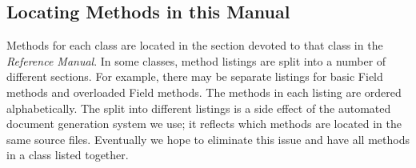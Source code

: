 \subsection{Locating Methods in this Manual}

Methods for each class are located in the section devoted to 
that class in the {\it Reference Manual}.  In some classes, method
listings
are split into a number of different sections.  For example, there may
be separate listings for basic Field methods and overloaded Field
methods.  The methods in each listing are ordered alphabetically.
The split into different
listings is a side effect of the automated document generation system
we use; it reflects which methods are located in the same source files.
Eventually we hope to eliminate this issue and have all methods in
a class listed together.


